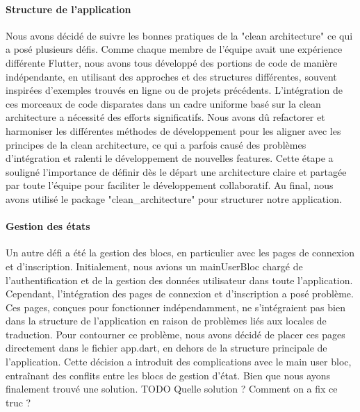 \paragraph{Structure de l'application} Nous avons décidé de suivre les bonnes pratiques de la "clean architecture" ce qui a posé plusieurs défis. Comme chaque membre de l'équipe avait une expérience différente Flutter, nous avons tous développé des portions de code de manière indépendante, en utilisant des approches et des structures différentes, souvent inspirées d'exemples trouvés en ligne ou de projets précédents. L'intégration de ces morceaux de code disparates dans un cadre uniforme basé sur la clean architecture a nécessité des efforts significatifs. Nous avons dû refactorer et harmoniser les différentes méthodes de développement pour les aligner avec les principes de la clean architecture, ce qui a parfois causé des problèmes d'intégration et ralenti le développement de nouvelles features. Cette étape a souligné l'importance de définir dès le départ une architecture claire et partagée par toute l'équipe pour faciliter le développement collaboratif. Au final, nous avons utilisé le package "clean\_architecture" pour structurer notre application.

\paragraph{Gestion des états} Un autre défi a été la gestion des blocs, en particulier avec les pages de connexion et d'inscription. Initialement, nous avions un mainUserBloc chargé de l'authentification et de la gestion des données utilisateur dans toute l'application. Cependant, l'intégration des pages de connexion et d'inscription a posé problème. Ces pages, conçues pour fonctionner indépendamment, ne s'intégraient pas bien dans la structure de l'application en raison de problèmes liés aux locales de traduction. Pour contourner ce problème, nous avons décidé de placer ces pages directement dans le fichier app.dart, en dehors de la structure principale de l'application. Cette décision a introduit des complications avec le main user bloc, entraînant des conflits entre les blocs de gestion d'état. Bien que nous ayons finalement trouvé une solution. TODO Quelle solution ? Comment on a fix ce truc ?
